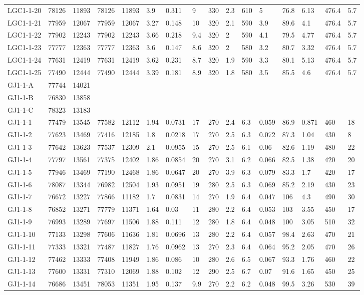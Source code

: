 \begin{longtable*}{@{}l@{~~}l@{~~}l@{~~}l@{~~}l@{~~}l@{~~}l@{~~}l@{~~}l@{~~}l@{~~}l@{~~}l@{~~}l@{~~}l@{~~}l@{~~}l@{}}
LGC1-1-20&78126&11893&78126&11893&3.9&0.311&9&330&2.3&610&5&76.8&6.13&476.4&5.7\\
LGC1-1-21&77959&12067&77959&12067&3.27&0.148&10&320&2.1&590&3.9&89.6&4.1&476.4&5.7\\
LGC1-1-22&77902&12243&77902&12243&3.66&0.218&9.4&320&2&590&4.1&79.5&4.77&476.4&5.7\\
LGC1-1-23&77777&12363&77777&12363&3.6&0.147&8.6&320&2&580&3.2&80.7&3.32&476.4&5.7\\
LGC1-1-24&77631&12419&77631&12419&3.62&0.231&8.7&320&1.9&590&3.3&80.1&5.13&476.4&5.7\\
LGC1-1-25&77490&12444&77490&12444&3.39&0.181&8.9&320&1.8&580&3.5&85.5&4.6&476.4&5.7\\
GJ1-1-A&77744&14021&&&&&&&&&&&&&\\
GJ1-1-B&76830&13858&&&&&&&&&&&&&\\
GJ1-1-C&78323&13183&&&&&&&&&&&&&\\
GJ1-1-1&77479&13545&77582&12112&1.94&0.0731&17&270&2.4&6.3&0.059&86.9&0.871&460&18\\
GJ1-1-2&77623&13469&77416&12185&1.8&0.0218&17&270&2.5&6.3&0.072&87.3&1.04&430&8\\
GJ1-1-3&77642&13623&77537&12309&2.1&0.0955&15&270&2.5&6.1&0.06&82.6&1.19&480&22\\
GJ1-1-4&77797&13561&77375&12402&1.86&0.0854&20&270&3.1&6.2&0.066&82.5&1.38&420&20\\
GJ1-1-5&77946&13469&77190&12468&1.86&0.0647&20&270&3.9&6.3&0.079&83.3&1.7&420&17\\
GJ1-1-6&78087&13344&76982&12504&1.93&0.0951&19&280&2.5&6.3&0.069&85.2&2.19&430&23\\
GJ1-1-7&76672&13227&77866&11182&1.7&0.0831&14&270&1.9&6.4&0.047&106&4.3&490&30\\
GJ1-1-8&76852&13271&77779&11371&1.64&0.03&11&280&2.2&6.4&0.053&103&3.55&450&17\\
GJ1-1-9&76993&13289&77697&11506&1.88&0.111&12&280&1.8&6.4&0.048&100&3.05&510&32\\
GJ1-1-10&77133&13298&77606&11636&1.81&0.0696&13&280&2.2&6.4&0.057&98.4&2.63&470&21\\
GJ1-1-11&77333&13321&77487&11827&1.76&0.0962&13&270&2.3&6.4&0.064&95.2&2.05&470&26\\
GJ1-1-12&77462&13333&77408&11949&1.86&0.086&10&280&2.6&6.5&0.067&93.3&1.76&460&22\\
GJ1-1-13&77600&13331&77310&12069&1.88&0.102&12&290&2.5&6.7&0.07&91.6&1.65&450&25\\
GJ1-1-14&76686&13451&78053&11351&1.95&0.137&9.9&270&2.2&6.2&0.048&99.5&3.26&530&39\\

\end{longtable*}
